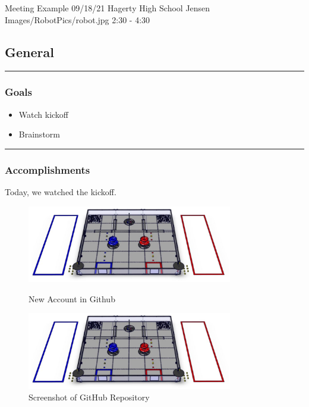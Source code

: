 \insertmeeting 
	{Meeting Example} 
	{09/18/21}
	{Hagerty High School}
	{Jensen}
	{Images/RobotPics/robot.jpg}
	{2:30 - 4:30}
	
\subsection*{General}
\noindent\hfil\rule{\textwidth}{.4pt}\hfil
\subsubsection*{Goals}
\begin{itemize}
    \item Watch kickoff
    \item Brainstorm   

\end{itemize} 

\noindent\hfil\rule{\textwidth}{.4pt}\hfil

\subsubsection*{Accomplishments}
Today, we watched the kickoff.
 

\begin{figure}[ht]
\centering
\begin{minipage}[b]{.50\textwidth}
  \centering
  \includegraphics[width=0.8\textwidth]{Meetings/September/09-18-21/field.png}
  \caption{New Account in Github}
  \label{fig:pic1}
\end{minipage}%
\hfill%
\begin{minipage}[b]{.50\textwidth}
  \centering
  \includegraphics[width=0.8\textwidth]{Meetings/September/09-18-21/field.png}
  \caption{Screenshot of GitHub Repository}
  \label{fig:pic2}
\end{minipage}
\end{figure}

